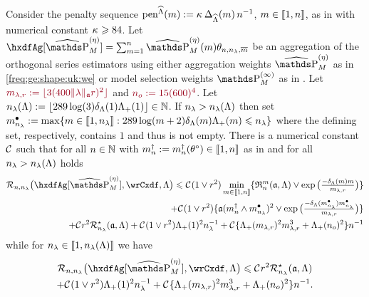 \begin{thm}\label{au:mrb:ag:ub:pnp}
  Consider the   penalty sequence $\peneSv:=\peneD$,
  $\Di\in\nset{1,\ssY}$, as in  with numerical
  constant $\cpen\geq84$. Let
  $\hxdfAg[{\erWe[]}]=\sum_{\Di=1}^{\ssY} \erWe\hxdfPr$ be an
  aggregation of the orthogonal series estimators using either
  aggregation weights $\erWe[]$ as in \eqref{freq:ge:shape:uk:we} or model
  selection weights $\msWe[]$ as in . Let
  $\dr\Di_{\edf,\xdfCr}:=\floor{3(400\Vnorm[{\xdfCw[]}]{\edf}\xdfCr)^2}$
  and $\dr \ssY_{o}:=15({600})^4$. Let
  $\ssE(\Lambda):=\floor{289\log(3)\cmiSv[1]\miSv[1]}\in\Nz$. If
  $\ssE>\ssE(\Lambda)$ then set
  $\sDi{\ssE}:=\max\{\Di\in\nset{1,\ssE}:289\log(\Di+2)\cmiSv[\Di]\miSv[\Di]\leq\ssE\}$
  where the defining set, respectively, contains $1$ and thus is not
  empty.  There is a numerical constant $\cst{}$ such that for all
  $\ssY\in\Nz$ with $\aDi{\ssY}:=\aDi{\ssY}(\xdf)\in\nset{1,n}$ as in
   and for all $\ssE>\ssE(\Lambda)$ holds
  \begin{multline}\label{au:mrb:ag:ub:pnp:e1}
    \nmRi{\hxdfAg[{\erWe[]}]}{\rwCxdf,\Lambda}  
    \leq\cst{}(1\vee\xdfCr^2)\min_{\Di\in\nset{1,\ssY}}
    \{\daRa{\Di}{(\xdfCw[],\Lambda)}\vee
    \exp\big(\tfrac{-\cmiSv[\Di]\Di}{\Di_{\edf,\xdfCr}}\big)\} \\\hfill
    +\cst{}(1\vee\xdfCr^2)\{\xdfCw[(\aDi{\ssY}\wedge\sDi{\ssE})]^2\vee
    \exp\big(\tfrac{-\cmiSv[\sDi{\ssE}]\sDi{\ssE}}{\Di_{\edf,\xdfCr}}\big)\}\\\hfill
    +\cst{}\xdfCr^2\mmRa{\xdfCw[],\Lambda}   + \cst{}(1\vee\xdfCr^2)\miSv[1]^2\ssE^{-1}  
    +\cst{}\{\miSv[\Di_{\edf,\xdfCr}]^2\Di_{\edf,\xdfCr}^3+\miSv[\ssY_{o}]^2\}\ssY^{-1}
  \end{multline}
  while for $\ssE\in\nset{1,\ssE(\Lambda)}$ we have
  \begin{multline}\label{au:mrb:ag:ub:pnp:e2}
    \nmRi{\hxdfAg[{\erWe[]}]}{\rwCxdf,\Lambda}  
    \leq \cst{}\xdfCr^2\mmRa{\xdfCw[],\Lambda}\\
    + \cst{}(1\vee\xdfCr^2)\miSv[1]^2\ssE^{-1}  
    +\cst{}\{\miSv[\Di_{\edf,\xdfCr}]^2\Di_{\edf,\xdfCr}^3+\miSv[\ssY_{o}]^2\}\ssY^{-1}.
  \end{multline}
\end{thm}


